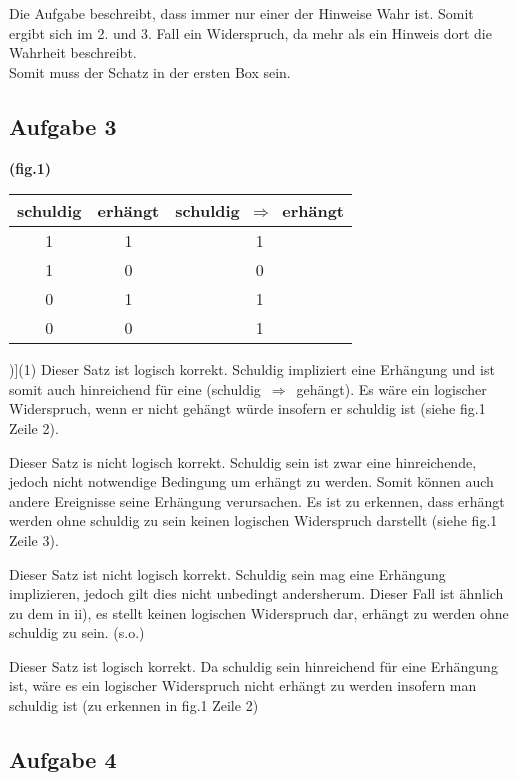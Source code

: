 \documentclass[a4paper,graphics,11pt]{article}
\newcommand\aufgabe[1]{\subsection*{Aufgabe #1}}
\begin{document}
Die Aufgabe beschreibt, dass immer nur einer der Hinweise Wahr ist. Somit ergibt
sich im 2. und 3. Fall ein Widerspruch, da mehr als ein Hinweis dort die Wahrheit
beschreibt.\\
Somit muss der Schatz in der ersten Box sein.


\aufgabe{3}
\textbf{(fig.1)}
    \begin{center}
        \begin{tabular}{|c|c|c|}
            \hline
            schuldig & erhängt & schuldig $\,\Rightarrow\,$ erhängt \\
            \hline
            1 & 1 & 1 \\
            \hline
            1 & 0 & 0 \\
            \hline
            0 & 1 & 1 \\
            \hline
            0 & 0 & 1 \\
            \hline
        \end{tabular}
    \end{center}

\begin{tasks}[counter-format=tsk[r])](1)
    \task Dieser Satz ist logisch korrekt. Schuldig impliziert eine Erhängung und ist
        somit auch hinreichend für eine (schuldig $\,\Rightarrow\,$ gehängt).
        Es wäre ein logischer Widerspruch, wenn er nicht gehängt würde insofern er
        schuldig ist (siehe fig.1 Zeile 2).

    \task Dieser Satz is nicht logisch korrekt. Schuldig sein ist zwar eine hinreichende,
        jedoch nicht notwendige Bedingung um erhängt zu werden. Somit können
        auch andere Ereignisse seine Erhängung verursachen.
        Es ist zu erkennen, dass erhängt werden ohne schuldig zu sein keinen
        logischen Widerspruch darstellt (siehe fig.1 Zeile 3).

    \task Dieser Satz ist nicht logisch korrekt. Schuldig sein mag eine Erhängung
        implizieren, jedoch gilt dies nicht unbedingt andersherum. Dieser Fall ist ähnlich
        zu dem in ii), es stellt keinen logischen Widerspruch dar, erhängt zu werden ohne
        schuldig zu sein. (s.o.)

    \task Dieser Satz ist logisch korrekt. Da schuldig sein hinreichend für eine Erhängung
        ist, wäre es ein logischer Widerspruch nicht erhängt zu werden insofern man
        schuldig ist (zu erkennen in fig.1 Zeile 2)
\end{tasks}


\aufgabe{4}
\end{document}
